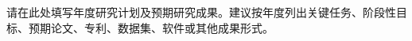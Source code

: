\begin{GDNSFParagraphs}
请在此处填写年度研究计划及预期研究成果。建议按年度列出关键任务、阶段性目标、预期论文、专利、数据集、软件或其他成果形式。

\GDNSFBlankPara
\end{GDNSFParagraphs}
